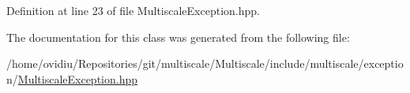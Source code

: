Definition at line 23 of file Multiscale\-Exception.\-hpp.



The documentation for this class was generated from the following file\-:\begin{DoxyCompactItemize}
\item 
/home/ovidiu/\-Repositories/git/multiscale/\-Multiscale/include/multiscale/exception/\hyperlink{MultiscaleException_8hpp}{Multiscale\-Exception.\-hpp}\end{DoxyCompactItemize}
